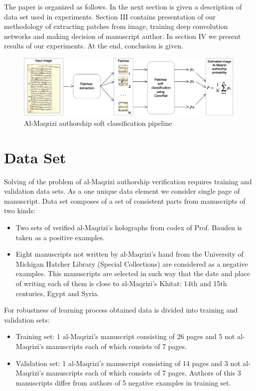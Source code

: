 \documentclass[conference,a4paper,twocolumn]{IEEEtran}
\begin{document}
The paper is organized as follows. In the next section is given a description of data set used in experiments. Section III contains presentation of our methodology of extracting patches from image, training deep convolution networks and making decision of manuscript author. In section IV we present results of our experiments. At the end, conclusion is given.  
	

\begin{figure}[!t]
	\center
  \includegraphics[width=\textwidth]{figures/Al-Maqrizi_classification_pipeline.png}
  \caption{Al-Maqrizi authorship soft classification pipeline}
  \label{fig:pipeline}
\end{figure}	
	
\section{Data Set}
\label{sec:the_data}

Solving of the problem of al-Maqrizi authorship verification requires training and validation data sets. As a one unique data element we consider single page of manuscript. Data set composes of a set of consistent parts from manuscripts of two kinds:
\begin{itemize}
	\item Two sets of verified al-Maqrizi's holographs from codex of Prof. Bauden is taken as a positive examples.
	\item Eight manuscripts not written by al-Maqrizi's hand from the University of Michigan Hatcher Library (Special Collections) are considered as a negative examples. This manuscripts are selected in such way that the date and place of writing each of them is close to al-Maqrizi's Khitat: 14th and 15th centuries, Egypt and Syria.
\end{itemize}
For robustness of learning process obtained data is divided into training and validation sets:
\begin{itemize}
	\item Training set: 1 al-Maqrizi's manuscript consisting of 26 pages and 5 not al-Maqrizi's manuscripts each of which consists of 7 pages.
	\item Validation set: 1 al-Maqrizi's manuscript consisting of 14 pages and 3 not al-Maqrizi's manuscripts each of which consists of 7 pages. Authors of this 3 manuscripts differ from authors of 5 negative examples in training set.   
\end{itemize}
\end{document}
